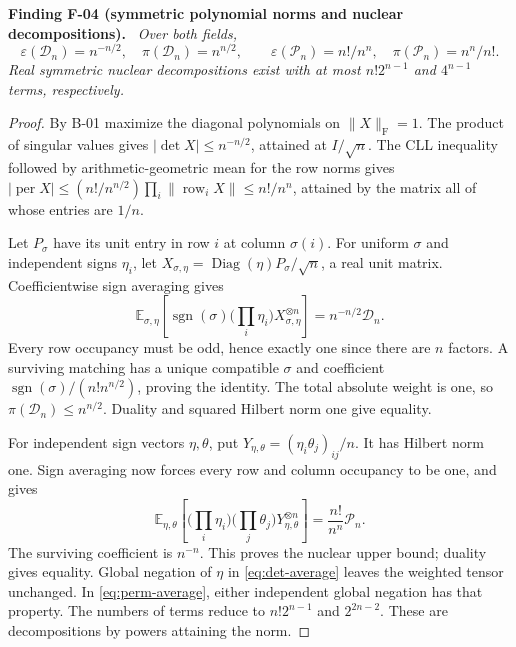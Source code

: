 \documentclass[11pt]{article}
\newcommand{\HS}[1]{\lVert #1\rVert_{\mathrm F}}
\newcommand{\eps}{\varepsilon}
\newcommand{\sgn}{\operatorname{sgn}}\newcommand{\diag}{\operatorname{Diag}}
\newenvironment{finding}[2]{\par\medskip\noindent\textbf{Finding #1 (#2).}\ \itshape}{\par\medskip}
\begin{document}
\begin{finding}{F-04}{symmetric polynomial norms and nuclear decompositions}
Over both fields,
\[
\eps(\mathcal D_n)=n^{-n/2},\quad\pi(\mathcal D_n)=n^{n/2},
\qquad
\eps(\mathcal P_n)=n!/n^n,\quad\pi(\mathcal P_n)=n^n/n!.
\]
Real symmetric nuclear decompositions exist with at most
$n!2^{n-1}$ and $4^{n-1}$ terms, respectively.
\end{finding}
\begin{proof}
By B-01 maximize the diagonal polynomials on $\HS X=1$.
The product of singular values gives
$|\det X|\leq n^{-n/2}$, attained at $I/\sqrt n$.
The CLL inequality followed by arithmetic-geometric mean for the
row norms gives
$|\operatorname{per}X|\leq(n!/n^{n/2})\prod_i\|\operatorname{row}_iX\|
\leq n!/n^n$, attained by the matrix all of whose entries are $1/n$.

Let $P_\sigma$ have its unit entry in row $i$ at column $\sigma(i)$.
For uniform $\sigma$ and independent signs $\eta_i$, let
$X_{\sigma,\eta}=\diag(\eta)P_\sigma/\sqrt n$, a real unit matrix.
Coefficientwise sign averaging gives
\begin{equation}\label{eq:det-average}
\mathbb E_{\sigma,\eta}
\left[\sgn(\sigma)\Big(\prod_i\eta_i\Big)X_{\sigma,\eta}^{\otimes n}\right]
=n^{-n/2}\mathcal D_n.
\end{equation}
Every row occupancy must be odd, hence exactly one since there are
$n$ factors. A surviving matching has a unique compatible $\sigma$
and coefficient $\sgn(\sigma)/(n!n^{n/2})$, proving the identity.
The total absolute weight is one, so $\pi(\mathcal D_n)\leq n^{n/2}$.
Duality and squared Hilbert norm one give equality.

For independent sign vectors $\eta,\theta$, put
$Y_{\eta,\theta}=(\eta_i\theta_j)_{ij}/n$. It has Hilbert norm one.
Sign averaging now forces every row and column occupancy to be one,
and gives
\begin{equation}\label{eq:perm-average}
\mathbb E_{\eta,\theta}
\left[\Big(\prod_i\eta_i\Big)\Big(\prod_j\theta_j\Big)
Y_{\eta,\theta}^{\otimes n}\right]
=\frac{n!}{n^n}\mathcal P_n.
\end{equation}
The surviving coefficient is $n^{-n}$. This proves the nuclear
upper bound; duality gives equality. Global negation of $\eta$
in \eqref{eq:det-average} leaves the weighted tensor unchanged.
In \eqref{eq:perm-average}, either independent global negation has
that property. The numbers of terms reduce to $n!2^{n-1}$ and
$2^{2n-2}$. These are decompositions by powers attaining the norm.
\end{proof}
\end{document}
